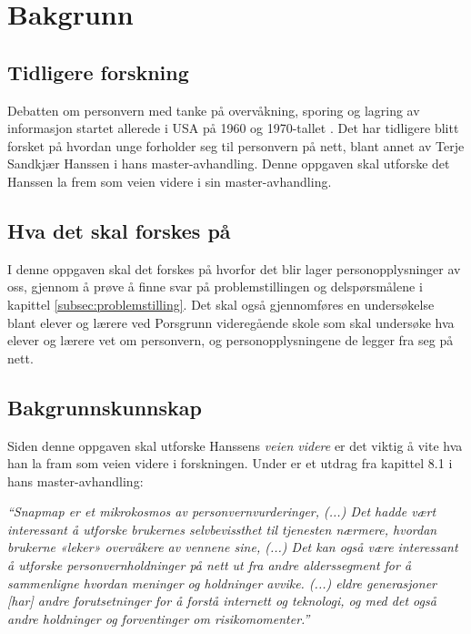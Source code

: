 \section{Bakgrunn}

\subsection{Tidligere forskning}
Debatten om personvern med tanke på overvåkning, sporing og lagring av informasjon startet allerede i USA på 1960 og 1970-tallet \parencite[36]{bok:nissenbaum}. Det har tidligere blitt forsket på hvordan unge forholder seg til personvern på nett, blant annet av Terje Sandkjær Hanssen i hans master-avhandling. Denne oppgaven skal utforske det Hanssen la frem som veien videre i sin master-avhandling. \parencite{master:hanssen}

\subsection{Hva det skal forskes på}
I denne oppgaven skal det forskes på hvorfor det blir lager personopplysninger av oss, gjennom å prøve å finne svar på problemstillingen og delspørsmålene i kapittel \ref{subsec:problemstilling}. Det skal også gjennomføres en undersøkelse blant elever og lærere ved Porsgrunn videregående skole som skal undersøke hva elever og lærere vet om personvern, og personopplysningene de legger fra seg på nett.

\subsection{Bakgrunnskunnskap}
Siden denne oppgaven skal utforske Hanssens \textit{veien videre} er det viktig å vite hva han la fram som veien videre i forskningen. Under er et utdrag fra kapittel 8.1 i hans master-avhandling:

\textit{``Snapmap er et mikrokosmos av personvernvurderinger, (...) Det hadde vært interessant å utforske brukernes selvbevissthet til tjenesten nærmere, hvordan brukerne «leker» overvåkere av vennene sine, (...) Det kan også være interessant å utforske personvernholdninger på nett ut fra andre alderssegment for å sammenligne hvordan meninger og holdninger avvike. (...) eldre generasjoner [har] andre forutsetninger for å forstå internett og teknologi, og med det også andre holdninger og forventinger om risikomomenter.''} \parencite[69]{master:hanssen}

\newpage